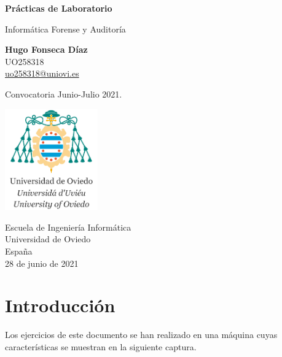 \documentclass[11pt]{article}
\begin{document}
\begin{titlepage}
 \begin{center}
        \vspace*{1cm}
            
        \Huge
        \textbf{Prácticas de Laboratorio}
            
        \vspace{0.5cm}
        \LARGE
        Informática Forense y Auditoría
            
        \vspace{1.5cm}
            
        \textbf{Hugo Fonseca Díaz}\\
        UO258318\\
        \href{mailto:uo258318@uniovi.es}{uo258318@uniovi.es}
            
        \vfill
            
        Convocatoria Junio-Julio 2021.
            
        \vspace{0.8cm}
            
        \includegraphics[width=0.3\textwidth]{other/uniovi_logo.jpg}
            
        \Large
        Escuela de Ingeniería Informática\\
        Universidad de Oviedo\\
        España\\
        28 de junio de 2021
            
    \end{center}
\end{titlepage}

\tableofcontents

\section{Introducción}
Los ejercicios de este documento se han realizado en una máquina cuyas características se muestran en la siguiente captura.
\end{document}
